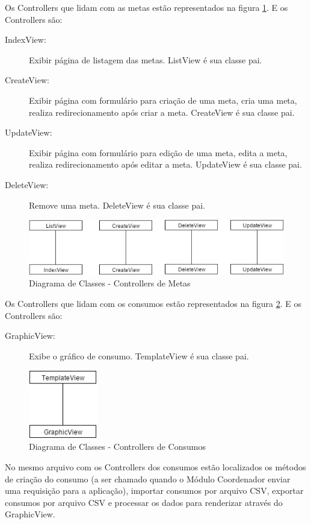 Os Controllers que lidam com as metas estão representados na figura \ref{fig:diagrama-cont-goal}. E os Controllers são:
\begin{description}
	\item[IndexView:] Exibir página de listagem das metas. ListView é sua classe pai.
	\item[CreateView:] Exibir página com formulário para criação de uma meta, cria uma meta, realiza redirecionamento após criar a meta. CreateView é sua classe pai.
	\item[UpdateView:] Exibir página com formulário para edição de uma meta, edita a meta, realiza redirecionamento após editar a meta. UpdateView é sua classe pai.
	\item[DeleteView:] Remove uma meta. DeleteView é sua classe pai.
\end{description} 

\begin{figure}[H]
\centering
\includegraphics[width=14cm,keepaspectratio]{figuras/diagrama_cont_goal.png}
\caption{\label{fig:diagrama-cont-goal} Diagrama de Classes - Controllers de Metas}
\end{figure}

Os Controllers que lidam com os consumos estão representados na figura \ref{fig:diagrama-cont-consumption}. E os Controllers são:
\begin{description}
	\item[GraphicView:] Exibe o gráfico de consumo. TemplateView é sua classe pai.
\end{description} 

\begin{figure}[H]
\centering
\includegraphics[width=3cm,keepaspectratio]{figuras/diagrama_cont_consumption.png}
\caption{\label{fig:diagrama-cont-consumption} Diagrama de Classes - Controllers de Consumos}
\end{figure}

No mesmo arquivo com os Controllers dos consumos estão localizados os métodos de criação do consumo (a ser chamado quando o Módulo Coordenador enviar uma requisição para a aplicação), importar consumos por arquivo CSV, exportar consumos por arquivo CSV e processar os dados para renderizar através do GraphicView.